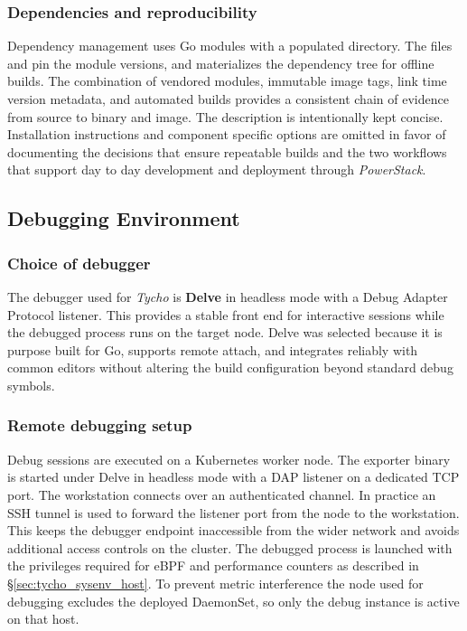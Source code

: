 \subsubsection{Dependencies and reproducibility}
\label{subsec:tycho_sysenv_build_deps}
Dependency management uses Go modules with a populated  directory. The files  and  pin the module versions, and  materializes the dependency tree for offline builds. The combination of vendored modules, immutable image tags, link time version metadata, and automated builds provides a consistent chain of evidence from source to binary and image. The description is intentionally kept concise. Installation instructions and component specific options are omitted in favor of documenting the decisions that ensure repeatable builds and the two workflows that support day to day development and deployment through \textit{PowerStack}.

\subsection{Debugging Environment}
\label{sec:tycho_sysenv_debug}

\subsubsection{Choice of debugger}
\label{subsec:tycho_sysenv_debug_choice}
The debugger used for \textit{Tycho} is \textbf{Delve} in headless mode with a Debug Adapter Protocol listener. This provides a stable front end for interactive sessions while the debugged process runs on the target node. Delve was selected because it is purpose built for Go, supports remote attach, and integrates reliably with common editors without altering the build configuration beyond standard debug symbols.

\subsubsection{Remote debugging setup}
\label{subsec:tycho_sysenv_debug_remote}
Debug sessions are executed on a Kubernetes worker node. The exporter binary is started under Delve in headless mode with a DAP listener on a dedicated TCP port. The workstation connects over an authenticated channel. In practice an SSH tunnel is used to forward the listener port from the node to the workstation. This keeps the debugger endpoint inaccessible from the wider network and avoids additional access controls on the cluster. The debugged process is launched with the privileges required for eBPF and performance counters as described in \S\ref{sec:tycho_sysenv_host}. To prevent metric interference the node used for debugging excludes the deployed DaemonSet, so only the debug instance is active on that host.

